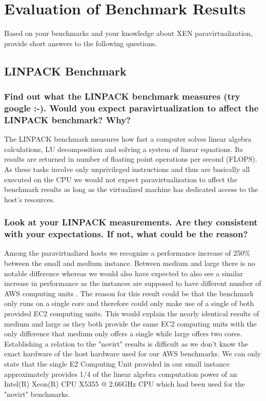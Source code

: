 \documentclass{article}
\begin{document}
\setcounter{section}{4}
\section{Evaluation of Benchmark Results}
Based on your benchmarks and your knowledge about XEN paravirtualization, provide short answers to the following questions.

\subsection{LINPACK Benchmark}
	\subsubsection{Find out what the LINPACK benchmark measures (try google :-). Would you expect paravirtualization to affect the LINPACK benchmark? Why?}

The LINPACK benchmark measures how fast a computer solves linear algebra calculations, LU decomposition and solving a system of linear equations. Its results are returned in number of floating point operations per second (FLOPS). As these tasks involve only unprivileged instructions and thus are basically all executed on the CPU we would not expect paravirtualization to affect the benchmark results as long as the virtualized machine has dedicated access to the host's resources.

	\subsubsection{Look at your LINPACK measurements. Are they consistent with your expectations. If not, what could be the reason?}

Among the paravirtualized hosts we recognize a performance increase of 250\% between the small and medium instance. Between medium and large there is no notable difference whereas we would also have expected to also see a similar increase in performance as the instances are supposed to have different number of AWS computing units \cite{aws}.
The reason for this result could be that the benchmark only runs on a single core and therefore could only make use of a single of both provided EC2 computing units. This would explain the nearly identical results of medium and large as they both provide the same EC2 computing units with the only difference that medium only offers a single while large offers two cores.
Establishing a relation to the "novirt" results is difficult as we don't know the exact hardware of the host hardware used for our AWS benchmarks. We can only state that the single E2 Computing Unit provided in our small instance \cite{aws} approximately provides 1/4 of the linear algebra computation power of an Intel(R) Xeon(R) CPU X5355 @ 2.66GHz CPU which had been used for the "novirt" benchmarks.
\end{document}
